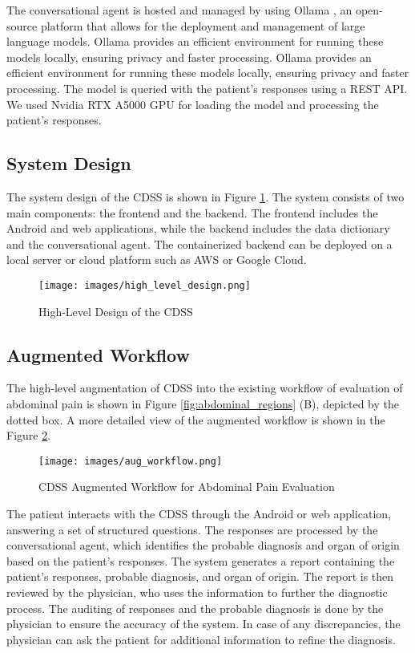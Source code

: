 \noindent The conversational agent is hosted and managed by using Ollama \cite{ollama}, an open-source platform that allows for the deployment and management of large language models. Ollama provides an efficient environment for running these models locally, ensuring privacy and faster processing. Ollama provides an efficient environment for running these models locally, ensuring privacy and faster processing. The model is queried with the patient's responses using a REST API. We used Nvidia RTX A5000 GPU for loading the model and processing the patient's responses.

\subsection{System Design}
The system design of the CDSS is shown in Figure \ref{fig:high_level_design}. The system consists of two main components: the frontend and the backend. The frontend includes the Android and web applications, while the backend includes the data dictionary and the conversational agent. The containerized backend can be deployed on a local server or cloud platform such as AWS or Google Cloud.
\begin{figure}[H]
    \centering
    \texttt{[image: images/high\_level\_design.png]}
    \caption{High-Level Design of the CDSS}
    \label{fig:high_level_design}
\end{figure}

\subsection{Augmented Workflow}
The high-level augmentation of CDSS into the existing workflow of evaluation of abdominal pain is shown in Figure \ref{fig:abdominal_regions} (B), depicted by the dotted box. A more detailed view of the augmented workflow is shown in the Figure \ref{fig:aug_workflow}.
\begin{figure}[H]
    \centering
    \texttt{[image: images/aug\_workflow.png]}
    \caption{CDSS Augmented Workflow for Abdominal Pain Evaluation}
    \label{fig:aug_workflow}
\end{figure}

\noindent The patient interacts with the CDSS through the Android or web application, answering a set of structured questions. The responses are processed by the conversational agent, which identifies the probable diagnosis and organ of origin based on the patient's responses. The system generates a report containing the patient's responses, probable diagnosis, and organ of origin. The report is then reviewed by the physician, who uses the information to further the diagnostic process. The auditing of responses and the probable diagnosis is done by the physician to ensure the accuracy of the system. In case of any discrepancies, the physician can ask the patient for additional information to refine the diagnosis.

